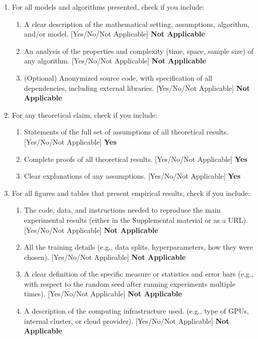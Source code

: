 \documentclass[twoside]{article}
\begin{document}
\begin{enumerate}
    \item For all models and algorithms presented, check if you include:
    \begin{enumerate}
        \item A clear description of the mathematical setting, assumptions, algorithm, and/or model. [Yes/No/Not Applicable] \textbf{Not Applicable}
        \item An analysis of the properties and complexity (time, space, sample size) of any algorithm. [Yes/No/Not Applicable]  \textbf{Not Applicable}
        \item (Optional) Anonymized source code, with specification of all dependencies, including external libraries. [Yes/No/Not Applicable] \textbf{Not Applicable}
    \end{enumerate}
    \item For any theoretical claim, check if you include:
    \begin{enumerate}
        \item Statements of the full set of assumptions of all theoretical results. [Yes/No/Not Applicable] \textbf{Yes}
        \item Complete proofs of all theoretical results. [Yes/No/Not Applicable] \textbf{Yes}
        \item Clear explanations of any assumptions. [Yes/No/Not Applicable]      \textbf{Yes}
    \end{enumerate}
    \item For all figures and tables that present empirical results, check if you include:
    \begin{enumerate}
        \item The code, data, and instructions needed to reproduce the main experimental results (either in the Supplemental material or as a URL). [Yes/No/Not Applicable] \textbf{Not Applicable}
        \item All the training details (e.g., data splits, hyperparameters, how they were chosen). [Yes/No/Not Applicable] \textbf{Not Applicable}
            \item A clear definition of the specific measure or statistics and error bars (e.g., with respect to the random seed after running experiments multiple times). [Yes/No/Not Applicable] \textbf{Not Applicable}
            \item A description of the computing infrastructure used. (e.g., type of GPUs, internal cluster, or cloud provider). [Yes/No/Not Applicable] \textbf{Not Applicable}

\end{enumerate}
\end{enumerate}
\end{document}
